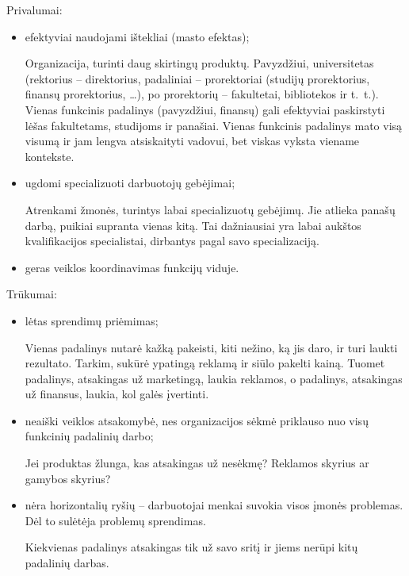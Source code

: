 Privalumai:
\begin{itemize}
  \item efektyviai naudojami ištekliai (masto efektas);
    \begin{note}
      Organizacija, turinti daug skirtingų produktų. Pavyzdžiui,
      universitetas (rektorius – direktorius, padaliniai – prorektoriai
      (studijų prorektorius, finansų prorektorius, …), po prorektorių –
      fakultetai, bibliotekos ir t.~t.). Vienas funkcinis padalinys
      (pavyzdžiui, finansų) gali efektyviai paskirstyti lėšas fakultetams,
      studijoms ir panašiai. Vienas funkcinis padalinys mato visą
      visumą ir jam lengva atsiskaityti vadovui, bet viskas vyksta
      viename kontekste.
    \end{note}
  \item ugdomi specializuoti darbuotojų gebėjimai;
    \begin{note}
      Atrenkami žmonės, turintys labai specializuotų gebėjimų. Jie
      atlieka panašų darbą, puikiai supranta vienas kitą. Tai
      dažniausiai yra labai aukštos kvalifikacijos specialistai,
      dirbantys pagal savo specializaciją.
    \end{note}
  \item geras veiklos koordinavimas funkcijų viduje.
\end{itemize}

Trūkumai:
\begin{itemize}
  \item lėtas sprendimų priėmimas;
    \begin{exmp}
      Vienas padalinys nutarė kažką pakeisti, kiti nežino, ką jis daro,
      ir turi laukti rezultato. Tarkim, sukūrė ypatingą reklamą ir siūlo
      pakelti kainą. Tuomet padalinys, atsakingas už marketingą, laukia
      reklamos, o padalinys, atsakingas už finansus, laukia, kol galės
      įvertinti.
    \end{exmp}
  \item neaiški veiklos atsakomybė, nes organizacijos sėkmė priklauso
    nuo visų funkcinių padalinių darbo;
    \begin{exmp}
      Jei produktas žlunga, kas atsakingas už nesėkmę? Reklamos skyrius
      ar gamybos skyrius?
    \end{exmp}
  \item nėra horizontalių ryšių – darbuotojai menkai suvokia visos
    įmonės problemas. Dėl to sulėtėja problemų sprendimas.
    \begin{note}
      Kiekvienas padalinys atsakingas tik už savo sritį ir jiems
      nerūpi kitų padalinių darbas.
    \end{note}
\end{itemize}

